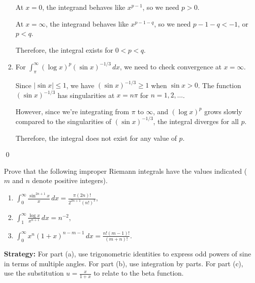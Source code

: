 \begin{enumerate}[label=(\alph*)]
At $x = 0$, the integrand behaves like $x^{p-1}$, so we need $p > 0$.

At $x = \infty$, the integrand behaves like $x^{p-1-q}$, so we need $p - 1 - q < -1$, or $p < q$.

Therefore, the integral exists for $0 < p < q$.

\item For $\int_{\pi}^{\infty} (\log x)^p (\sin x)^{-1/3} \, dx$, we need to check convergence at $x = \infty$.

Since $|\sin x| \leq 1$, we have $(\sin x)^{-1/3} \geq 1$ when $\sin x > 0$. The function $(\sin x)^{-1/3}$ has singularities at $x = n\pi$ for $n = 1, 2, \ldots$.

However, since we're integrating from $\pi$ to $\infty$, and $(\log x)^p$ grows slowly compared to the singularities of $(\sin x)^{-1/3}$, the integral diverges for all $p$.

Therefore, the integral does not exist for any value of $p$.
\end{enumerate}\qed


\begin{problembox}
\begin{problemstatement}
Prove that the following improper Riemann integrals have the values indicated ($m$ and $n$ denote positive integers).
\begin{enumerate}[label=(\alph*)]
\item $\int_{0}^{\infty} \frac{\sin^{2n+1} x}{x} \, dx = \frac{\pi(2n)!}{2^{2n+1}(n!)^2}$,
\item $\int_{1}^{\infty} \frac{\log x}{x^{n+1}} \, dx = n^{-2}$,
\item $\int_{0}^{\infty} x^n (1 + x)^{n-m-1} \, dx = \frac{n!(m-1)!}{(m+n)!}$.
\end{enumerate}
\end{problemstatement}
\end{problembox}

\noindent\textbf{Strategy:} For part (a), use trigonometric identities to express odd powers of sine in terms of multiple angles. For part (b), use integration by parts. For part (c), use the substitution $u = \frac{x}{1+x}$ to relate to the beta function.

